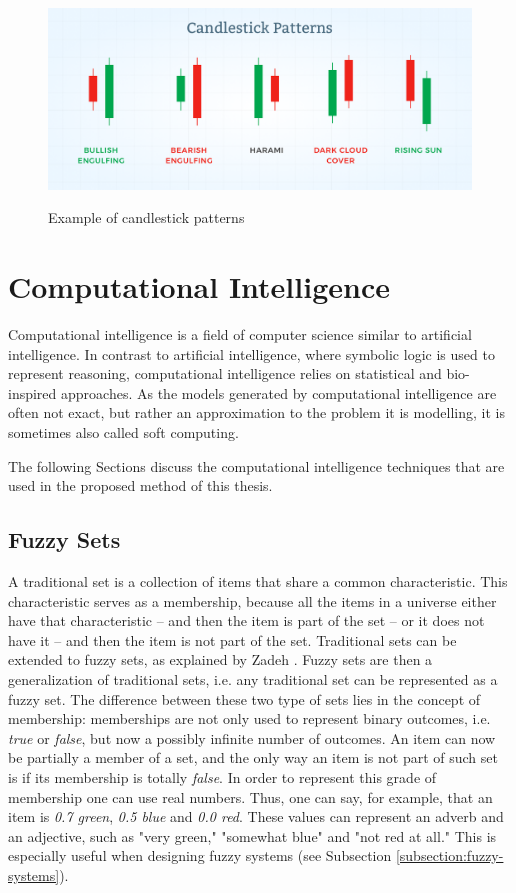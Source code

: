\begin{figure}
\caption{Example of candlestick patterns}
\centering
\includegraphics[width=1.0\textwidth]{img/candlestick-patterns.png}
\label{figure:candlestick-patterns}
\end{figure}

\section{Computational Intelligence}
\label{section:computational-intelligence}

Computational intelligence is a field of computer science similar to artificial intelligence. In contrast to artificial intelligence, where symbolic logic is used to represent reasoning, computational intelligence relies on statistical and bio-inspired approaches. As the models generated by computational intelligence are often not exact, but rather an approximation to the problem it is modelling, it is sometimes also called soft computing. %

The following Sections discuss the computational intelligence techniques that are used in the proposed method of this thesis.

\subsection{Fuzzy Sets}
\label{subsection:fuzzy-sets}

A traditional set is a collection of items that share a common characteristic. This characteristic serves as a membership, because all the items in a universe either have that characteristic -- and then the item is part of the set -- or it does not have it -- and then the item is not part of the set. Traditional sets can be extended to fuzzy sets, as explained by Zadeh \cite{Zadeh1965}. Fuzzy sets are then a generalization of traditional sets, i.e. any traditional set can be represented as a fuzzy set. The difference between these two type of sets lies in the concept of membership: memberships are not only used to represent binary outcomes, i.e. \textit{true} or \textit{false}, but now a possibly infinite number of outcomes. An item can now be partially a member of a set, and the only way an item is not part of such set is if its membership is totally \textit{false}. In order to represent this grade of membership one can use real numbers. Thus, one can say, for example, that an item is \textit{0.7 green}, \textit{0.5 blue} and \textit{0.0 red}. These values can represent an adverb and an adjective, such as "very green," "somewhat blue" and "not red at all." This is especially useful when designing fuzzy systems (see Subsection \ref{subsection:fuzzy-systems}).

